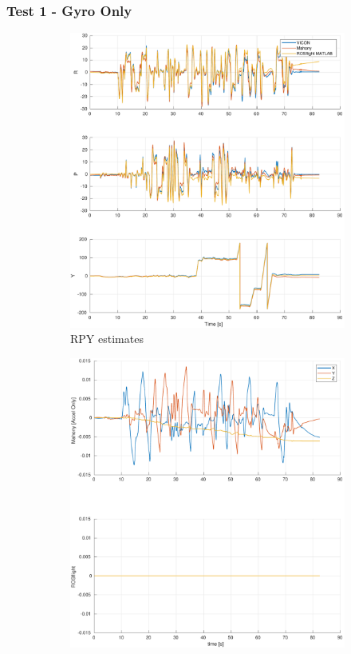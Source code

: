 \documentclass[a4paper]{article}
\begin{document}
\subsubsection*{Test 1 - Gyro Only}

\begin{figure}[H]
  \centering
  \begin{subfigure}[t]{0.31\textwidth}
    \includegraphics[width=\textwidth]{estrpy_gyroonly.pdf}
    \caption{RPY estimates}
    \label{fig:scf_meas}
  \end{subfigure}\hfill
  \begin{subfigure}[t]{0.31\textwidth}
    \includegraphics[width=\textwidth]{estbias_gyroonly.pdf}

\end{subfigure}
\end{figure}
\end{document}
